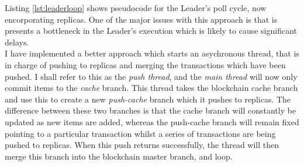 \documentclass[12pt,a4paper,twoside,openright]{report}
\begin{document}
	Listing \ref{lst:leaderloop} shows pseudocode for the Leader's poll cycle, now encorporating replicas. 
	One of the major issues with this approach is that is presents a bottleneck in the Leader's execution which is likely to cause significant delays.\\

	I have implemented a better approach which starts an asychronous thread, that is in charge of pushing to replicas and merging the transactions which have been pushed.
	I shall refer to this as the \textit{push thread}, and the \textit{main thread} will now only commit items to the \textit{cache} branch.
	This thread takes the blockchain cache branch and use this to create a new \textit{push-cache} branch which it pushes to replicas.
	The difference between these two branches is that the cache branch will constantly be updated as new items are added, whereas the push-cache branch will remain fixed pointing to a particular transaction whilst a series of transactions are being pushed to replicas. 
	When this push returns successfully, the thread will then merge this branch into the blockchain master branch, and loop.
\end{document}
